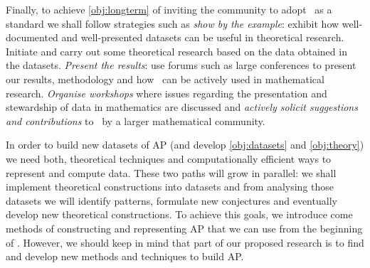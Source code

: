 Finally, to achieve \cref{obj:longterm} of inviting the community to adopt \ourp\ as a standard we shall follow strategies such as \emph{show by the example}: exhibit how well-documented and well-presented datasets can be useful in theoretical research. Initiate and carry out some theoretical research based on the data obtained in the datasets. \emph{Present the results}: use forums such as large conferences to present our results, methodology and how \ourp\ can be actively used in mathematical research. \emph{Organise workshops} where issues regarding the presentation and stewardship of data in mathematics are discussed and \emph{actively solicit suggestions and contributions} to \ourp\ by a larger mathematical community.

%




In order to build new datasets of AP (and develop \cref{obj:datasets} and \cref{obj:theory}) we need both, theoretical techniques and computationally efficient ways to represent and compute data. These two paths will grow in parallel: we shall implement theoretical constructions into datasets and from analysing those datasets we will identify patterns, formulate new conjectures and eventually develop new theoretical constructions.
To achieve this goals, we introduce come methods of constructing and representing AP that we can use from the beginning of \ourp.
However, we should keep in mind that part of our proposed research is to find and develop new methods and techniques to build AP.

